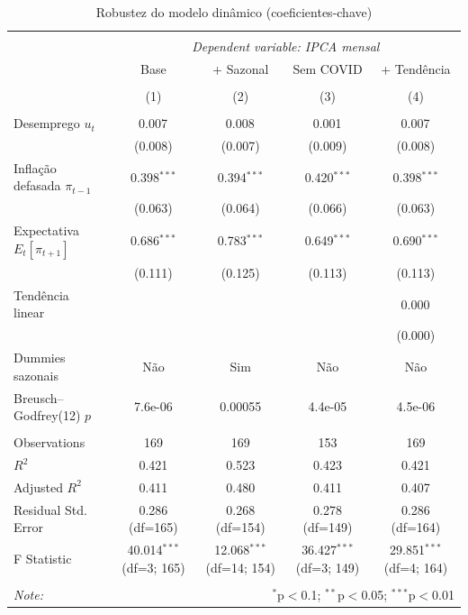 \begin{table}[!htbp] \centering
  \caption{Robustez do modelo dinâmico (coeficientes-chave)}
\begin{tabular}{@{\extracolsep{5pt}}lcccc}
\\[-1.8ex]\hline
\hline \\[-1.8ex]
& \multicolumn{4}{c}{\textit{Dependent variable: IPCA mensal}} \
\cr \cline{2-5}
\\[-1.8ex] & \multicolumn{1}{c}{Base} & \multicolumn{1}{c}{+ Sazonal} & \multicolumn{1}{c}{Sem COVID} & \multicolumn{1}{c}{+ Tendência}  \\
\\[-1.8ex] & (1) & (2) & (3) & (4) \\
\hline \\[-1.8ex]
 Desemprego $u_t$ & 0.007$^{}$ & 0.008$^{}$ & 0.001$^{}$ & 0.007$^{}$ \\
& (0.008) & (0.007) & (0.009) & (0.008) \\
 Inflação defasada $\pi_{t-1}$ & 0.398$^{***}$ & 0.394$^{***}$ & 0.420$^{***}$ & 0.398$^{***}$ \\
& (0.063) & (0.064) & (0.066) & (0.063) \\
 Expectativa $E_t[\pi_{t+1}]$ & 0.686$^{***}$ & 0.783$^{***}$ & 0.649$^{***}$ & 0.690$^{***}$ \\
& (0.111) & (0.125) & (0.113) & (0.113) \\
 Tendência linear & & & & 0.000$^{}$ \\
& & & & (0.000) \\
 Dummies sazonais & Não & Sim & Não & Não \\
 Breusch--Godfrey(12) $p$ & 7.6e-06 & 0.00055 & 4.4e-05 & 4.5e-06 \\
\hline \\[-1.8ex]
 Observations & 169 & 169 & 153 & 169 \\
 $R^2$ & 0.421 & 0.523 & 0.423 & 0.421 \\
 Adjusted $R^2$ & 0.411 & 0.480 & 0.411 & 0.407 \\
 Residual Std. Error & 0.286 (df=165) & 0.268 (df=154) & 0.278 (df=149) & 0.286 (df=164) \\
 F Statistic & 40.014$^{***}$ (df=3; 165) & 12.068$^{***}$ (df=14; 154) & 36.427$^{***}$ (df=3; 149) & 29.851$^{***}$ (df=4; 164) \\
\hline
\hline \\[-1.8ex]
\textit{Note:} & \multicolumn{4}{r}{$^{*}$p$<$0.1; $^{**}$p$<$0.05; $^{***}$p$<$0.01} \\
\end{tabular}
\end{table}